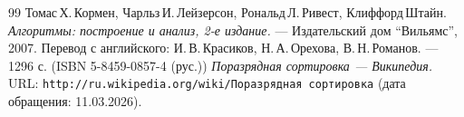 \begin{thebibliography}{99}
Томас\,Х.\,Кормен, Чарльз\,И.\,Лейзерсон, Рональд\,Л.\,Ривест, Клиффорд\,Штайн.
{\itshape Алгоритмы: построение и анализ, 2-е издание.} --- Издательский дом \enquote{Вильямс}, 2007. Перевод с английского: И.\,В.\,Красиков, Н.\,А.\,Орехова, В.\,Н.\,Романов. --- 1296 с. (ISBN 5-8459-0857-4 (рус.))
{\itshape Поразрядная сортировка — Википедия.} \\URL: \texttt{http://ru.wikipedia.org/wiki/Поразрядная сортировка} (дата обращения: 11.03.2026).
\end{thebibliography}
\pagebreak


